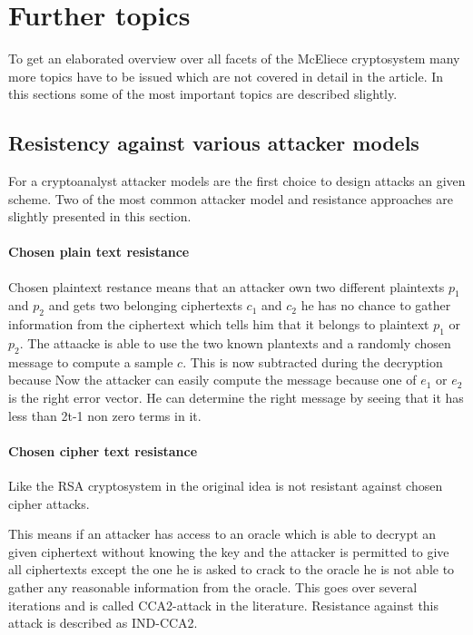 \section{Further topics}
To get an elaborated overview over all facets of the McEliece cryptosystem many more topics have to be issued which are not covered in detail in the article. In this sections some of the most important topics are described slightly. 


\subsection*{Resistency against various attacker models}
For a cryptoanalyst attacker models are the first choice to design attacks an given scheme. Two of the most common attacker model and resistance approaches are slightly presented in this section.

\paragraph*{Chosen plain text resistance}
Chosen plaintext restance means that an attacker own two different plaintexts $p_1$ and $p_2$ and gets two belonging ciphertexts $c_1$ and $c_2$ he has no chance to gather information from the ciphertext which tells him that it belongs to plaintext $p_1$ or $p_2$.
The attaacke is able to use the two known plantexts and a randomly chosen message to compute a sample $c$. This is now subtracted during the decryption because
Now the attacker can easily compute the message because one of $e_1$ or $e_2$ is the right error vector. He can determine the right message by seeing that it has less than 2t-1 non zero terms in it.


\paragraph*{Chosen cipher text resistance}
Like the RSA cryptosystem in the original idea is not resistant against chosen cipher attacks. 

This means if an attacker has access to an oracle which is able to decrypt an given ciphertext without knowing the key and the attacker is permitted to give all ciphertexts except the one he is asked to crack to the oracle he is not able to gather any reasonable information from the oracle. This goes over several iterations and is called CCA2-attack in the literature. Resistance against this attack is described as IND-CCA2. 

